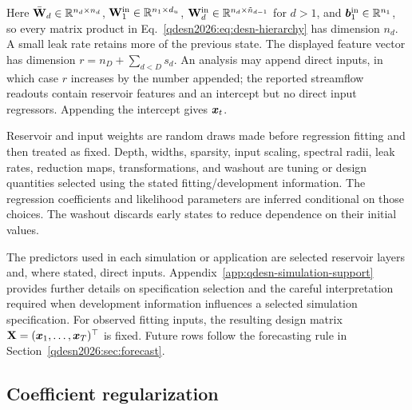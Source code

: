 Here \(\bar{\mathbf{W}}_d\in\mathbb{R}^{n_d\times n_d}\),
\(\mathbf{W}_1^{\mathrm{in}}\in\mathbb{R}^{n_1\times d_u}\),
\(\mathbf{W}_d^{\mathrm{in}}\in\mathbb{R}^{n_d\times\tilde n_{d-1}}\) for \(d>1\),
and \(\boldsymbol{b}_1^{\mathrm{in}}\in\mathbb{R}^{n_1}\), so every matrix product in
Eq.~\eqref{qdesn2026:eq:desn-hierarchy} has dimension \(n_d\).
A small leak rate retains more of the previous state. The displayed feature
vector has dimension \(r=n_D+\sum_{d<D}s_d\). An analysis may append direct inputs,
in which case \(r\) increases by the number appended; the reported streamflow
readouts contain reservoir features and an intercept but no direct input
regressors. Appending the intercept gives \(\boldsymbol{x}_t\).

Reservoir and input weights are random draws made before regression fitting
and then treated as fixed. Depth, widths, sparsity, input scaling, spectral
radii, leak rates, reduction maps, transformations, and washout are tuning or
design quantities selected using the stated fitting/development information.
The regression coefficients and likelihood parameters are inferred
conditional on those choices. The washout discards early states to reduce
dependence on their initial values.

The predictors used in each simulation or application are selected reservoir
layers and, where stated, direct inputs.
Appendix~\ref{app:qdesn-simulation-support} provides further details on
specification selection and the careful interpretation required when
development information influences a selected simulation specification. For
observed fitting inputs, the resulting design matrix
\(\mathbf{X}=(\boldsymbol{x}_1,\ldots,\boldsymbol{x}_T)^\top\) is fixed. Future rows follow
the forecasting rule in Section~\ref{qdesn2026:sec:forecast}.

\subsection{Coefficient regularization}

